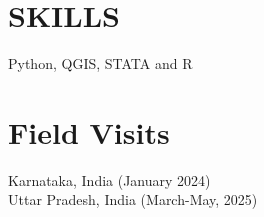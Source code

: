 \documentclass[letterpaper,11pt]{article}
\begin{document}
\vspace{0.15cm}

\section{\textbf{SKILLS}}
\hspace{0.5cm}Python, QGIS, STATA and R

\section{\textbf{Field Visits}}
\hspace{0.5cm} Karnataka, India (January 2024)\\
\hspace{0.5cm} Uttar Pradesh, India (March-May, 2025)



\end{document}
